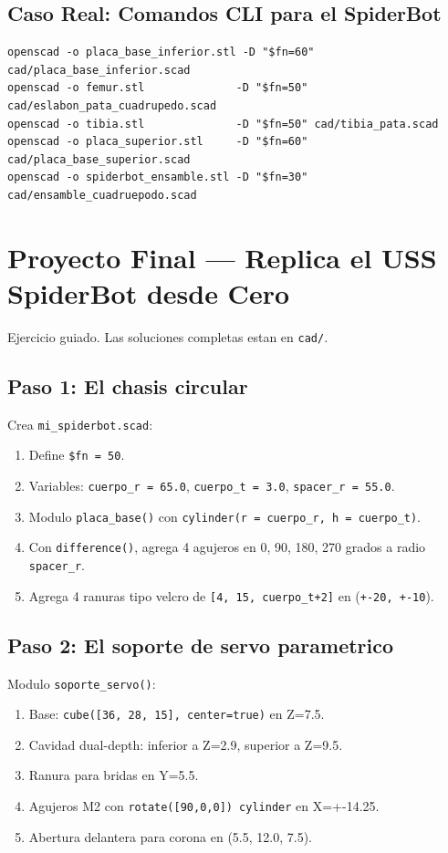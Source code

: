 \documentclass[12pt, oneside, a4paper]{report}
\newcommand{\codigo}[1]{\texttt{#1}}
\begin{document}
\section{Caso Real: Comandos CLI para el SpiderBot}
{\footnotesize
\begin{verbatim}
openscad -o placa_base_inferior.stl -D "$fn=60" cad/placa_base_inferior.scad
openscad -o femur.stl              -D "$fn=50" cad/eslabon_pata_cuadrupedo.scad
openscad -o tibia.stl              -D "$fn=50" cad/tibia_pata.scad
openscad -o placa_superior.stl     -D "$fn=60" cad/placa_base_superior.scad
openscad -o spiderbot_ensamble.stl -D "$fn=30" cad/ensamble_cuadruepodo.scad
\end{verbatim}
}

\chapter{Proyecto Final --- Replica el USS SpiderBot desde Cero}

Ejercicio guiado. Las soluciones completas estan en \codigo{cad/}.

\section{Paso 1: El chasis circular}
Crea \codigo{mi\_spiderbot.scad}:
\begin{enumerate}
    \item Define \codigo{\$fn = 50}.
    \item Variables: \codigo{cuerpo\_r = 65.0}, \codigo{cuerpo\_t = 3.0}, \codigo{spacer\_r = 55.0}.
    \item Modulo \codigo{placa\_base()} con \codigo{cylinder(r = cuerpo\_r, h = cuerpo\_t)}.
    \item Con \codigo{difference()}, agrega 4 agujeros en 0, 90, 180, 270 grados a radio \codigo{spacer\_r}.
    \item Agrega 4 ranuras tipo velcro de \codigo{[4, 15, cuerpo\_t+2]} en (\codigo{+-20, +-10}).
\end{enumerate}

\section{Paso 2: El soporte de servo parametrico}
Modulo \codigo{soporte\_servo()}:
\begin{enumerate}
    \item Base: \codigo{cube([36, 28, 15], center=true)} en Z=7.5.
    \item Cavidad dual-depth: inferior a Z=2.9, superior a Z=9.5.
    \item Ranura para bridas en Y=5.5.
    \item Agujeros M2 con \codigo{rotate([90,0,0]) cylinder} en X=+-14.25.
    \item Abertura delantera para corona en (5.5, 12.0, 7.5).
\end{enumerate}
\end{document}
